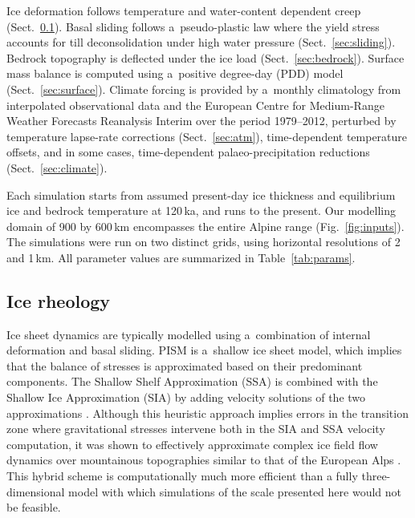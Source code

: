 \documentclass[tc, manuscript]{copernicus}
\begin{document}
    Ice deformation follows temperature and water-content dependent creep
    (Sect.~\ref{sec:icedyn}). Basal sliding follows a~pseudo-plastic law where
    the yield stress accounts for till deconsolidation under high water
    pressure (Sect.~\ref{sec:sliding}). Bedrock topography is deflected
    under the ice load (Sect.~\ref{sec:bedrock}). Surface mass balance is
    computed using a~positive degree-day (PDD) model (Sect.~\ref{sec:surface}).
    Climate forcing is provided by a~monthly climatology from interpolated
    observational data \citep[WorldClim;][]{Hijmans.etal.2005} and the European
    Centre for Medium-Range Weather Forecasts Reanalysis Interim
    \citep[ERA-Interim;][]{Dee.etal.2011} over the period 1979--2012,
    perturbed by temperature lapse-rate
    corrections (Sect.~\ref{sec:atm}), time-dependent temperature offsets, and
    in some cases, time-dependent palaeo-precipitation reductions
    (Sect.~\ref{sec:climate}).

    Each simulation starts from assumed present-day ice thickness and
    equilibrium ice and bedrock temperature at 120\,\unit{ka}, and runs to the
    present. Our modelling domain of 900 by 600\,\unit{km} encompasses the
    entire Alpine range (Fig.~\ref{fig:inputs}). The simulations were run on
    two distinct grids, using horizontal resolutions of 2 and 1\,\unit{km}.
    All parameter values are summarized in Table~\ref{tab:params}.


\subsection{Ice rheology}
\label{sec:icedyn}

    Ice sheet dynamics are typically modelled using a~combination of internal
    deformation and basal sliding. PISM is a~shallow ice sheet model, which
    implies that the balance of stresses is approximated based on their
    predominant components. The Shallow Shelf Approximation (SSA) is combined
    with the Shallow Ice Approximation (SIA) by adding velocity solutions of
    the two approximations \citep[Eqs.~7--9 and 15]{Winkelmann.etal.2011}.
    Although this heuristic approach implies errors in the transition zone
    where gravitational stresses intervene both in the SIA and SSA velocity
    computation, it was shown to effectively approximate complex ice field flow
    dynamics over mountainous topographies similar to that of the European Alps
    \citep{Golledge.etal.2012, Ziemen.etal.2016}. This hybrid scheme is
    computationally much more efficient than a fully three-dimensional model
    with which simulations of the scale presented here would not be feasible.
\end{document}
